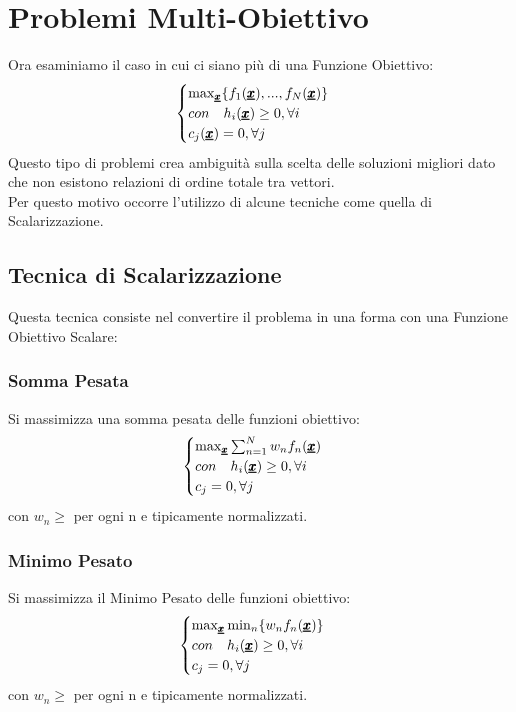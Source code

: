 \section{Problemi Multi-Obiettivo}
Ora esaminiamo il caso in cui ci siano più di una Funzione Obiettivo:
\begin{equation*}
    \begin{cases}
    \max_{\pmb{\underline{x}}} \{f_1(\pmb{\underline{x}}),...,f_N(\pmb{\underline{x}})\} \\
    con \quad h_i(\pmb{\underline{x}}) \geq 0, \forall i \\
    c_j(\pmb{\underline{x}}) = 0, \forall j
    \end{cases}
\end{equation*}
Questo tipo di problemi crea ambiguità sulla scelta delle soluzioni migliori dato che non esistono relazioni di ordine totale tra vettori.\\ 
Per questo motivo occorre l'utilizzo di alcune tecniche come quella di Scalarizzazione.

\subsection{Tecnica di Scalarizzazione}
Questa tecnica consiste nel convertire il problema in una forma con una Funzione Obiettivo Scalare:
\subsubsection{Somma Pesata}
Si massimizza una somma pesata delle funzioni obiettivo:
\begin{equation*}
    \begin{cases}
    \max_{\pmb{\underline{x}}} \sum_{n=1}^N w_n f_n(\pmb{\underline{x}})\\
    con \quad h_i(\pmb{\underline{x}}) \geq 0, \forall i\\
    c_j = 0, \forall j
    \end{cases}
\end{equation*}
con $w_n \geq$ per ogni n e tipicamente normalizzati.

\subsubsection{Minimo Pesato}
Si massimizza il Minimo Pesato delle funzioni obiettivo:
\begin{equation*}
    \begin{cases}
    \max_{\pmb{\underline{x}}} \min_n \{ w_n f_n(\pmb{\underline{x}})\}
    \\con \quad h_i(\pmb{\underline{x}}) \geq 0, \forall i\\
    c_j = 0, \forall j
    \end{cases}
\end{equation*}
con $w_n \geq$ per ogni n e tipicamente normalizzati.

